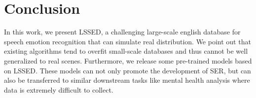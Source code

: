 \documentclass{article}
\begin{document}
\section{Conclusion}
\label{sec:conclusion}
In this work, we present LSSED, a challenging large-scale english database for speech emotion recognition that can simulate real distribution. 
We point out that existing algorithms tend to overfit small-scale databases and thus cannot be well generalized to real scenes. 
Furthermore, we release some pre-trained models based on LSSED. 
These models can not only promote the development of SER, but can also be transferred to similar downstream tasks like mental health analysis where data is extremely difficult to collect.

\small


\end{document}
